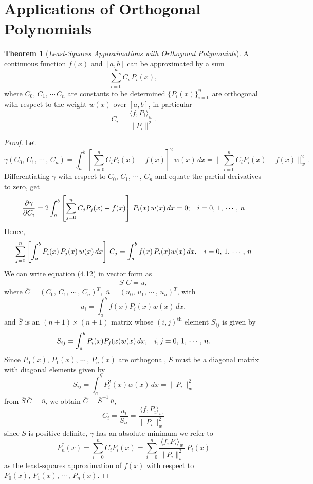 \documentclass[12pt,a4paper]{report}
\theoremstyle{definition}
\newtheorem{thm}{Theorem}[section]
\theoremstyle{plain}
\begin{document}
\section{Applications of Orthogonal Polynomials}

\begin{thm}[\textit{Least-Squares Approximations with Orthogonal Polynomials}]
A continuous function $f(x)$ and $[a,b]$ can be approximated by a sum $$\sum_{i = 0}^nC_i\, P_i(x),$$ where $C_0, \,C_1, \, \cdots\, C_n$ are constants to be determined $\{P_i(x)\}^n_{i = 0}$ are orthogonal with respect to the weight $w(x)$ over $[a,b]$, in particular $$C_i = \frac{\langle f,P_i\rangle_w}{\lVert P_i\rVert^2}.$$
\end{thm}

\begin{proof}
Let $$\gamma\left(C_0, \, C_1, \, \cdots\, , \, C_n\right) = \int_a^b\left[\sum_{i = 0}^nC_iP_i(x) - f(x)\right]^2\, w(x)\, dx = \Bigg\|\sum_{i = 0}^nC_iP_i(x) - f(x)\Bigg\|^2_w.$$
Differentiating $\gamma$ with respect to $C_0, \, C_1, \, \cdots\, , \, C_n$ and equate the partial derivatives to zero, get
$$\frac{\partial \gamma}{\partial C_i} = 2\int_a^b\left[\sum_{j=0}^nC_jP_j(x) - f(x)\right]\,P_i(x)\, w(x)\, dx = 0; \hspace{0.3cm} i = 0, \, 1, \, \cdots\, , \, n$$
Hence,
\begin{equation}
\sum_{j = 0}^n\left[\int_a^bP_i(x)\, P_j(x) \, w(x)\, dx\right]\, C_j = \int_a^bf(x)\, P_i(x)w(x)\, dx, \hspace{0.3cm} i = 0, \, 1, \, \cdots\, , \, n
\end{equation}
We can write equation (4.12) in vector form as $$\overline{S}\,\,\overline{C} = \overline{u},$$ where $\overline{C} = \left(C_0, \, C_1, \, \cdots\, , \, C_n\right)^T$, $\, \overline{u} = \left(u_0, \, u_1, \, \cdots\, ,\, u_n\right)^T$, with
$$u_i = \int_a^bf(x)P_i(x)w(x)\, dx,$$ and $\overline{S}$ is an $(n+1)\times (n+1)$ matrix whose $(i,j)^{\text{th}}$ element $S_{ij}$ is given by
$$S_{ij} = \int_a^bP_i(x)P_j(x)w(x)\, dx, \hspace{0.3cm} i,j = 0, \, 1, \, \cdots\, , \, n.$$
Since $P_0(x), \, P_1(x), \, \cdots\, ,\, P_n(x)$ are orthogonal, $\overline{S}$ must be a diagonal matrix with diagonal elements given by $$S_{ij} = \int_a^bP^2_i(x) w(x)\, dx = \lVert P_i\rVert^2_w$$ from $\overline{S}\, \overline{C} = \overline{u}$, we obtain $\overline{C} = \overline{S}^{-1}\, \overline{u}$, 
$$C_i = \frac{u_i}{S_{ii}} = \frac{\langle f, P_i\rangle_w}{\lVert P_i\rVert^2_w}$$
since $\overline{S}$ is positive definite, $\gamma$ has an absolute minimum we refer to $$P^*_n(x) = \sum_{i = 0}^nC_i P_i(x) = \sum_{i=0}^n\frac{\langle f,P_i\rangle_w}{\lVert P_i\rVert_w^2}\, P_i(x)$$ as the least-squares approximation of $f(x)$ with respect to $P_0(x), \, P_1(x), \, \cdots\, , \, P_n(x)$.
\end{proof}
\end{document}
